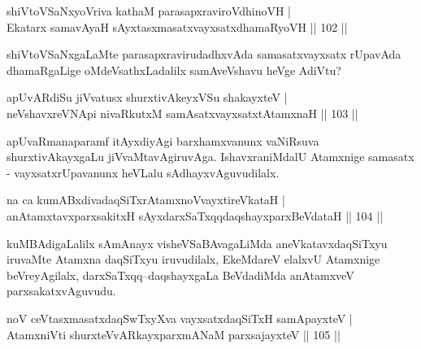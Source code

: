 
\begin{shl}
shiVtoVSaNxyoVriva kathaM parasapxraviroVdhinoVH |\\
Ekatarx samavAyaH sAyxtasxmasatxvayxsatxdhamaRyoVH \hfill || 102 ||
\end{shl}

\begin{artha}
shiVtoVSaNxgaLaMte parasapxravirudadhxvAda samasatxvayxsatx rUpavAda dhamaRgaLige oMdeVsathxLadalilx samAveVshavu heVge AdiVtu? 
\end{artha}


\begin{shl}
apUvARdiSu jiVvatusx shurxtivAkeyxVSu shakayxteV |\\
neVshavxreVNApi nivaRkutxM samAsatxvayxsatxtA\s \s tamxnaH \hfill || 103 ||
\end{shl}

\begin{artha}
apUvaRmanaparamf itAyxdiyAgi barxhamxvanunx vaNiRsuva shurxtivAkayxgaLu jiVvaMtavAgiruvAga. IshavxraniMdalU Atamxnige samasatx - vayxsatxrUpavanunx heVLalu sAdhayxvAguvudilalx.
\end{artha}


\begin{shl}
na ca kumABxdivadaqSiTxrAtamxnoV\s vayxtireVkataH |\\
anAtamxtavxparxsakitxH sAyxdarxSaTxqqdaqshayxparxBeVdataH \hfill || 104 ||
\end{shl}

\begin{artha}
kuMBAdigaLalilx sAmAnayx visheVSaBAvagaLiMda aneVkatavxdaqSiTxyu iruvaMte Atamxna daqSiTxyu iruvudilalx, EkeMdareV elalxvU Atamxnige beVreyAgilalx, darxSaTxqq--daqshayxgaLa BeVdadiMda anAtamxveV parxsakatxvAguvudu.
\end{artha}


\begin{shl}
noV ceVtasxmasatxdaqSwTxyXva vayxsatxdaqSiTxH samApayxteV |\\
AtamxniVti shurxteVvARkayxparxmANaM parxsajayxteV \hfill || 105 ||
\end{shl}

